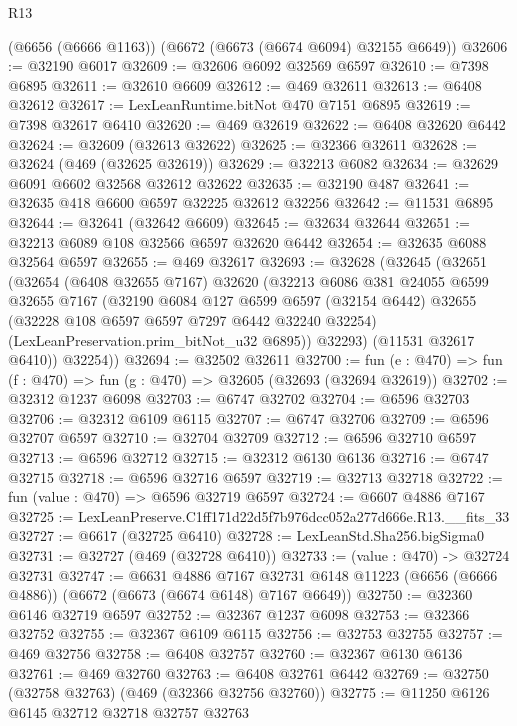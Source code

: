 \begin{lexlean}{R13}
\begin{coremodule}
    (@6656 (@6666 @1163))
    (@6672 (@6673 (@6674 @6094) @32155 @6649))
@32606 := @32190 @6017
@32609 := @32606 @6092 @32569 @6597
@32610 := @7398 @6895
@32611 := @32610 @6609
@32612 := @469 @32611
@32613 := @6408 @32612
@32617 := LexLeanRuntime.bitNot @470 @7151 @6895
@32619 := @7398 @32617 @6410
@32620 := @469 @32619
@32622 := @6408 @32620 @6442
@32624 := @32609 (@32613 @32622)
@32625 := @32366 @32611
@32628 := @32624 (@469 (@32625 @32619))
@32629 := @32213 @6082
@32634 := @32629 @6091 @6602 @32568 @32612 @32622
@32635 := @32190 @487
@32641 := @32635 @418 @6600 @6597 @32225 @32612 @32256
@32642 := @11531 @6895
@32644 := @32641 (@32642 @6609)
@32645 := @32634 @32644
@32651 := @32213 @6089 @108 @32566 @6597 @32620 @6442
@32654 := @32635 @6088 @32564 @6597
@32655 := @469 @32617
@32693 := @32628
    (@32645
      (@32651
        (@32654
          (@6408 @32655 @7167)
          @32620
          (@32213
            @6086
            @381
            @24055
            @6599
            @32655
            @7167
            (@32190
              @6084
              @127
              @6599
              @6597
              (@32154 @6442)
              @32655
              (@32228 @108 @6597 @6597 @7297 @6442 @32240 @32254)
              (LexLeanPreservation.prim_bitNot_u32 @6895))
            @32293)
          (@11531 @32617 @6410))
        @32254))
@32694 := @32502 @32611
@32700 := fun (e : @470) => fun (f : @470) => fun (g : @470) => @32605 (@32693 (@32694 @32619))
@32702 := @32312 @1237 @6098
@32703 := @6747 @32702
@32704 := @6596 @32703
@32706 := @32312 @6109 @6115
@32707 := @6747 @32706
@32709 := @6596 @32707 @6597
@32710 := @32704 @32709
@32712 := @6596 @32710 @6597
@32713 := @6596 @32712
@32715 := @32312 @6130 @6136
@32716 := @6747 @32715
@32718 := @6596 @32716 @6597
@32719 := @32713 @32718
@32722 := fun (value : @470) => @6596 @32719 @6597
@32724 := @6607 @4886 @7167
@32725 := LexLeanPreserve.C1ff171d22d5f7b976dcc052a277d666e.R13.__fits_33
@32727 := @6617 (@32725 @6410)
@32728 := LexLeanStd.Sha256.bigSigma0
@32731 := @32727 (@469 (@32728 @6410))
@32733 := (value : @470) -> @32724 @32731
@32747 := @6631
    @4886
    @7167
    @32731
    @6148
    @11223
    (@6656 (@6666 @4886))
    (@6672 (@6673 (@6674 @6148) @7167 @6649))
@32750 := @32360 @6146 @32719 @6597
@32752 := @32367 @1237 @6098
@32753 := @32366 @32752
@32755 := @32367 @6109 @6115
@32756 := @32753 @32755
@32757 := @469 @32756
@32758 := @6408 @32757
@32760 := @32367 @6130 @6136
@32761 := @469 @32760
@32763 := @6408 @32761 @6442
@32769 := @32750 (@32758 @32763) (@469 (@32366 @32756 @32760))
@32775 := @11250 @6126 @6145 @32712 @32718 @32757 @32763

\end{coremodule}
\end{lexlean}
